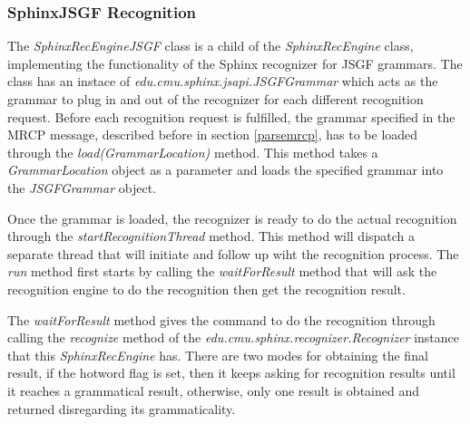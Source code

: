 \subsubsection{SphinxJSGF Recognition}
The \textit{SphinxRecEngineJSGF} class is a child of the \textit{SphinxRecEngine} class, implementing the functionality of the Sphinx recognizer for JSGF grammars.
The class has an instace of \textit{edu.cmu.sphinx.jsapi.JSGFGrammar} which acts as the grammar to plug in and out of the recognizer for each different recognition request.
Before each recognition request is fulfilled, the grammar specified in the MRCP message, described before in section \ref{parsemrcp}, has to be loaded through the \textit{load(GrammarLocation)} method.
This method takes a \textit{GrammarLocation} object as a parameter and loads the specified grammar into the \textit{JSGFGrammar} object.


Once the grammar is loaded, the recognizer is ready to do the actual recognition through the \textit{startRecognitionThread} method.
This method will dispatch a separate thread that will initiate and follow up wiht the recognition process.
The \textit{run} method first starts by calling the \textit{waitForResult} method that will ask the recognition engine to do the recognition then get the recognition result.


The \textit{waitForResult} method gives the command to do the recognition through calling the \textit{recognize} method of the \textit{edu.cmu.sphinx.recognizer.Recognizer} instance that this \textit{SphinxRecEngine} has.
There are two modes for obtaining the final result, if the hotword flag is set, then it keeps asking for recognition results until it reaches a grammatical result, otherwise, only one result is obtained and returned disregarding its grammaticality.


